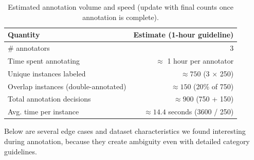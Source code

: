 \documentclass[11pt]{article}
\begin{document}
\begin{table}[h]
\centering
\begin{tabular}{@{}lr@{}}
\toprule
Quantity & Estimate (1-hour guideline) \\
\midrule
\# annotators & 3 \\
Time spent annotating & $\approx$ 1 hour per annotator \\
Unique instances labeled & $\approx 750$ (3 $\times$ 250) \\
Overlap instances (double-annotated) & $\approx 150$ (20\% of 750) \\
Total annotation decisions & $\approx 900$ (750 + 150) \\
Avg. time per instance & $\approx 14.4$ seconds (3600 / 250) \\
\bottomrule
\end{tabular}
\caption{Estimated annotation volume and speed (update with final counts once annotation is complete).}
\end{table}

Below are several edge cases and dataset characteristics we found interesting during annotation, because they create ambiguity even with detailed category guidelines.
\end{document}
